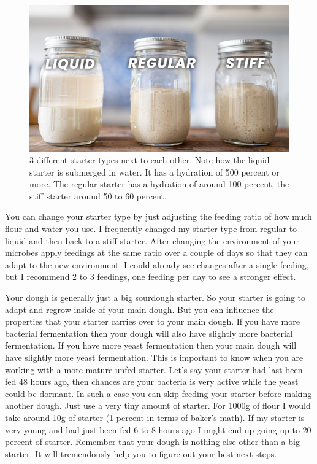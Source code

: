 \begin{figure}[!htb]
  \includegraphics[width=\textwidth]{sourdough-starter-types}
  \caption{3 different starter types next to each other. Note how the liquid starter is submerged
  in water. It has a hydration of 500 percent or more.
  The regular starter has a hydration of around 100 percent, the stiff starter around 50 to 60 percent.}
  \label{fig:starter-types}
\end{figure}


You can change your starter type by just adjusting the feeding ratio of how
much flour and water you use. I frequently changed my starter type from
regular to liquid and then back to a stiff starter. After changing the
environment of your microbes apply feedings at the same ratio over a couple of
days so that they can adapt to the new environment. I could already see
changes after a single feeding, but I recommend 2 to 3 feedings, one feeding per
day to see a stronger effect.

Your dough is generally just a big sourdough starter. So your starter is going
to adapt and regrow inside of your main dough. But you can influence the
properties that your starter carries over to your main dough. If you have more
bacterial fermentation then your dough will also have slightly more bacterial
fermentation. If you have more yeast fermentation then your main dough will
have slightly more yeast fermentation. This is important to know when you are
working with a more mature unfed starter. Let's say your starter had last been
fed 48 hours ago, then chances are your bacteria is very active while the
yeast could be dormant. In such a case you can skip feeding your starter
before making another dough. Just use a very tiny amount of starter. For 1000g
of flour I would take around 10g of starter (1 percent in terms of baker's
math). If my starter is very young and had just been fed 6 to 8 hours ago I might
end up going up to 20 percent of starter. Remember that your dough is nothing
else other than a big starter. It will tremendously help you to figure out
your best next steps.

